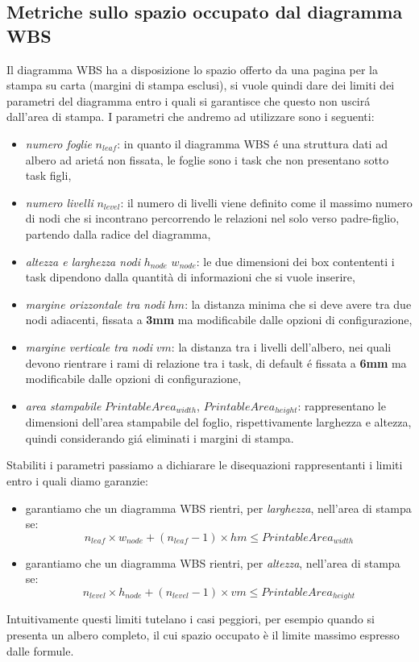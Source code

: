 \subsection{Metriche sullo spazio occupato dal diagramma WBS}
Il diagramma WBS ha a disposizione lo spazio offerto da una pagina per la
stampa su carta (margini di stampa esclusi), si vuole quindi dare dei limiti dei parametri del diagramma entro i quali si garantisce che questo non uscir\'a dall'area di stampa. I parametri che andremo ad utilizzare sono i seguenti:
\begin{itemize}
	\item \emph{numero foglie} $n_{leaf}$: in quanto il diagramma WBS \'e una
	struttura dati ad albero ad ariet\'a non fissata, le foglie sono i task che non
	presentano sotto task figli,
	\item \emph{numero livelli} $n_{level}$: il numero di livelli viene definito come il massimo numero di nodi che si incontrano percorrendo le relazioni nel solo verso padre-figlio, partendo dalla radice del diagramma,
	\item \emph{altezza e larghezza nodi} $h_{node}$ $w_{node}$: le due dimensioni dei box contententi i task dipendono dalla quantità di informazioni che si vuole inserire,
	\item \emph{margine orizzontale tra nodi} $hm$: la distanza minima che si deve avere tra due nodi adiacenti, fissata a \textbf{3mm} ma modificabile dalle opzioni di configurazione,
	\item \emph{margine verticale tra nodi} $vm$: la distanza tra i livelli
	dell'albero, nei quali devono rientrare i rami di relazione tra i task, di default \'e fissata a \textbf{6mm} ma modificabile dalle opzioni di configurazione,
	\item \emph{area stampabile} $PrintableArea_{width}$,
	$PrintableArea_{height}$: rappresentano le dimensioni dell'area stampabile del foglio, rispettivamente larghezza e altezza, quindi considerando gi\'a eliminati i margini di stampa.
\end{itemize}

Stabiliti i parametri passiamo a dichiarare le disequazioni rappresentanti i limiti entro i quali diamo garanzie:
\begin{itemize}
	\item garantiamo che un diagramma WBS rientri, per \emph{larghezza}, nell'area di stampa se:
	$$ n_{leaf} \times w_{node} + (n_{leaf} - 1) \times hm \leq 
	PrintableArea_{width} $$
	\item garantiamo che un diagramma WBS rientri, per \emph{altezza}, nell'area di stampa se:
	$$ n_{level} \times h_{node} + (n_{level} - 1) \times vm \leq 
	PrintableArea_{height} $$
\end{itemize}
Intuitivamente questi limiti tutelano i casi peggiori, per esempio quando si
presenta un albero completo, il cui spazio occupato \`e il limite massimo espresso dalle formule.

